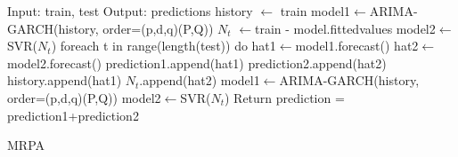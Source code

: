 \documentclass[12pt]{article}
\begin{document}
 
\begin{algorithm}[H]
\SetAlgoLined
Input: train, test\;
Output: predictions\;
history $\leftarrow$ train\;
model1$\leftarrow$ARIMA-GARCH(history, order=(p,d,q)(P,Q))\;
 $N_t$ $\leftarrow$train - model.fittedvalues\;
model2$\leftarrow$SVR($N_t$)\;
for{\State each t  in  range(length(test))} do{
   hat1$\leftarrow$model1.forecast()\;
   hat2$\leftarrow$model2.forecast()\;
   prediction1.append(hat1)\;
   prediction2.append(hat2)\;
   history.append(hat1)\;
   $N_t$.append(hat2)\;
   model1$\leftarrow$ARIMA-GARCH(history, order=(p,d,q)(P,Q))\;
   model2$\leftarrow$SVR($N_t$)\;
 }
 Return prediction = prediction1+prediction2\;
 
 
 \caption{MRPA}
\end{algorithm}
\end{document}
